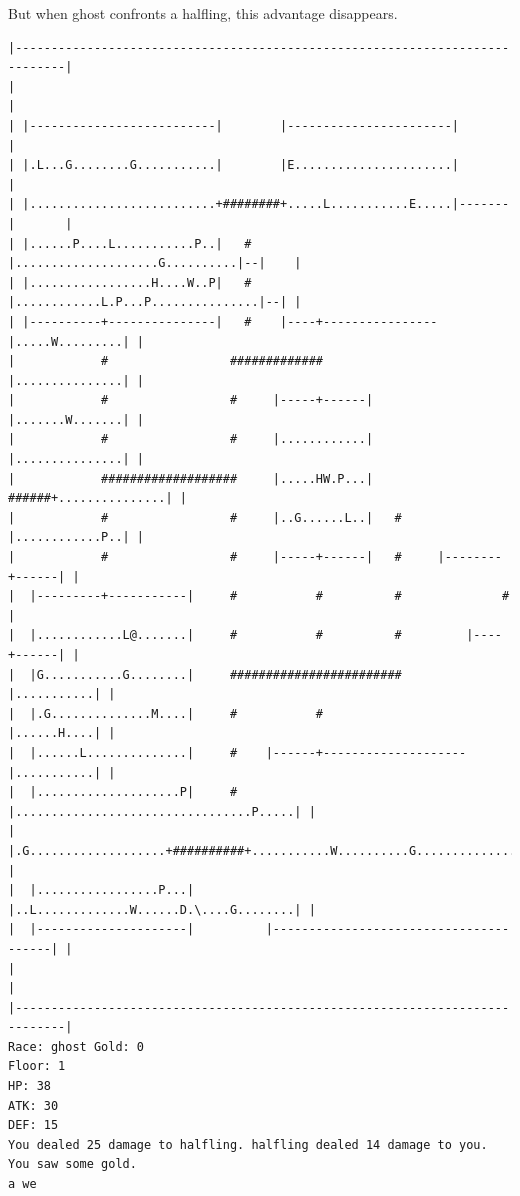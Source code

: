 \documentclass[11pt]{article}
\theoremstyle{plain}
\begin{document}
\newpage
But when ghost confronts a halfling, this advantage disappears.
\begin{Verbatim}[fontsize=\scriptsize]
|-----------------------------------------------------------------------------|
|                                                                             |
| |--------------------------|        |-----------------------|               |
| |.L...G........G...........|        |E......................|               |
| |..........................+########+.....L...........E.....|-------|       |
| |......P....L...........P..|   #    |....................G..........|--|    |
| |.................H....W..P|   #    |............L.P...P...............|--| |
| |----------+---------------|   #    |----+----------------|.....W.........| |
|            #                 #############                |...............| |
|            #                 #     |-----+------|         |.......W.......| |
|            #                 #     |............|         |...............| |
|            ###################     |.....HW.P...|   ######+...............| |
|            #                 #     |..G......L..|   #     |............P..| |
|            #                 #     |-----+------|   #     |--------+------| |
|  |---------+-----------|     #           #          #              #        |
|  |............L@.......|     #           #          #         |----+------| |
|  |G...........G........|     ########################         |...........| |
|  |.G..............M....|     #           #                    |......H....| |
|  |......L..............|     #    |------+--------------------|...........| |
|  |....................P|     #    |.................................P.....| |
|  |.G...................+##########+...........W..........G................| |
|  |.................P...|          |..L.............W......D.\....G........| |
|  |---------------------|          |---------------------------------------| |
|                                                                             |
|-----------------------------------------------------------------------------|
Race: ghost Gold: 0                                                    Floor: 1
HP: 38
ATK: 30
DEF: 15
You dealed 25 damage to halfling. halfling dealed 14 damage to you. You saw some gold. 
a we


\end{Verbatim}
\end{document}
